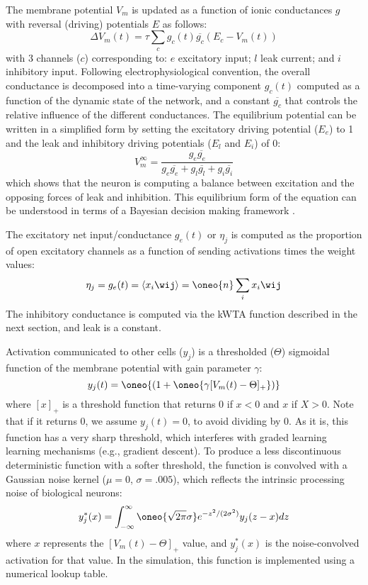 The membrane potential $V_m$ is updated as a function of ionic conductances $g$ with reversal (driving) potentials $E$ as follows:
\begin{equation}
  \Delta V_m(t) = \tau \sum_c g_c(t) \overline{g_c} (E_c - V_m(t))
  \label{eq.vm}
\end{equation}
with 3 channels ($c$) corresponding to: $e$ excitatory input; $l$ leak current; and $i$ inhibitory input.  Following electrophysiological convention, the overall conductance is decomposed into a time-varying component $g_c(t)$ computed as a function of the dynamic state of the network, and a constant $\overline{g_c}$ that controls the relative influence of the different conductances.  The equilibrium potential can be written in a simplified form by setting the excitatory driving potential ($E_e$) to 1 and the leak and inhibitory driving potentials ($E_l$ and $E_i$) of 0:
\begin{equation}
  V_m^\infty = \frac{g_e \overline{g_e}} {g_e
   \overline{g_e} + g_l \overline{g_l} + g_i \overline{g_i}}  
\end{equation}
which shows that the neuron is computing a balance between excitation and the opposing forces of leak and inhibition.  This equilibrium form of the equation can be understood in terms of a Bayesian decision making framework \cite{OReillyMunakata00}.

The excitatory net input/conductance $g_e(t)$ or $\eta_j$ is computed as the proportion of open excitatory channels as a function of sending activations times the weight values:
\begin{equation}
  \eta_j = g_e(t) = \langle x_i \wij \rangle = \oneo{n} \sum_i x_i \wij
  \label{eq.net_in_avg}
\end{equation}
The inhibitory conductance is computed via the kWTA function described in the next section, and leak is a constant.

Activation communicated to other cells ($y_j$) is a thresholded ($\Theta$) sigmoidal function of the membrane potential with gain parameter $\gamma$:
\begin{equation}
  y_j(t) = \oneo{\left(1 + \oneo{\gamma [V_m(t) - \Theta]_+} \right)}
\end{equation}
where $[x]_+$ is a threshold function that returns 0 if $x<0$ and $x$ if $X>0$.  Note that if it returns 0, we assume $y_j(t) = 0$, to avoid dividing by 0.  As it is, this function has a very sharp threshold, which interferes with graded learning learning mechanisms (e.g., gradient descent).  To produce a less discontinuous deterministic function with a softer threshold, the function is convolved with a Gaussian noise kernel ($\mu=0$, $\sigma=.005$), which reflects the intrinsic processing noise of biological neurons:
\begin{equation}
  y^*_j(x) = \int_{-\infty}^{\infty} \oneo{\sqrt{2 \pi} \sigma}
  e^{-z^2/(2 \sigma^2)} y_j(z-x) dz
  \label{eq.conv}
\end{equation}
where $x$ represents the $[V_m(t) - \Theta]_+$ value, and $y^*_j(x)$ is the noise-convolved activation for that value.  In the simulation, this function is implemented using a numerical lookup table.

